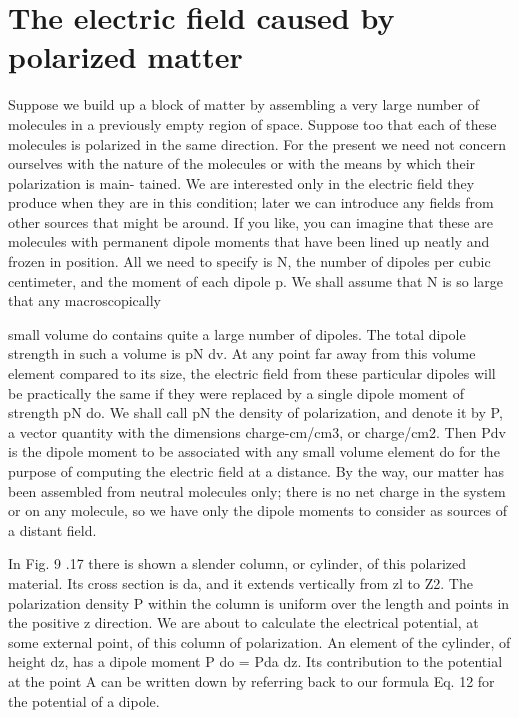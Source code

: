 \iffalse

\section{The electric field caused by polarized matter}

Suppose we build up a block of matter by assembling a very large
number of molecules in a previously empty region of space. Suppose
too that each of these molecules is polarized in the same direction.
For the present we need not concern ourselves with the nature of the
molecules or with the means by which their polarization is main-
tained. We are interested only in the electric field they produce when
they are in this condition; later we can introduce any fields from other
sources that might be around. If you like, you can imagine that these
are molecules with permanent dipole moments that have been lined
up neatly and frozen in position. All we need to specify is N, the
number of dipoles per cubic centimeter, and the moment of each
dipole p. We shall assume that N is so large that any macroscopically

small volume do contains quite a large number of dipoles. The total
dipole strength in such a volume is pN dv. At any point far away
from this volume element compared to its size, the electric field from
these particular dipoles will be practically the same if they were replaced
by a single dipole moment of strength pN do. We shall call pN
the density of polarization, and denote it by P, a vector quantity with
the dimensions charge-cm/cm3, or charge/cm2. Then Pdv is the
dipole moment to be associated with any small volume element do
for the purpose of computing the electric field at a distance. By the
way, our matter has been assembled from neutral molecules only;
there is no net charge in the system or on any molecule, so we have
only the dipole moments to consider as sources of a distant field.

In Fig. 9 .17 there is shown a slender column, or cylinder, of this
polarized material. Its cross section is da, and it extends vertically
from zl to Z2. The polarization density P within the column is uniform
over the length and points in the positive z direction. We are
about to calculate the electrical potential, at some external point, of
this column of polarization. An element of the cylinder, of height dz,
has a dipole moment P do = Pda dz. Its contribution to the potential
at the point A can be written down by referring back to our
formula Eq. 12 for the potential of a dipole.

